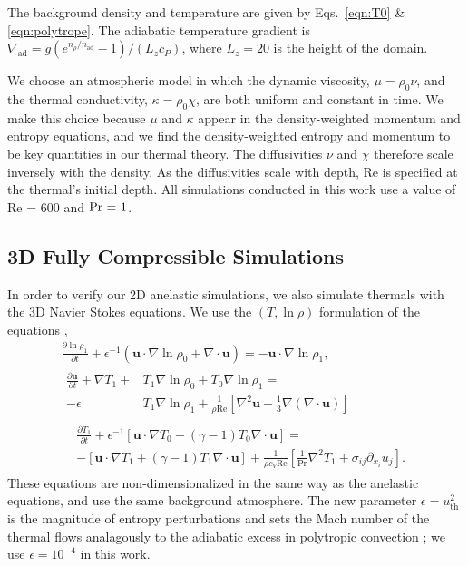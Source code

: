 \documentclass[twocolumn, amsmath, amsfonts, amssymb, trackchanges]{aastex62}
\newcommand{\DivU}{\ensuremath{\nabla\cdot\bm{u}}}
\newcommand{\grad}{\ensuremath{\nabla}}
\begin{document}
The background density and temperature are given by Eqs.~\ref{eqn:T0} \& \ref{eqn:polytrope}.
The adiabatic temperature gradient is $\nabla_{\text{ad}}=g(e^{n_\rho/n_{\text{ad}}}-1)/(L_z c_P)$, where $L_z=20$ is the height of the domain.

We choose an atmospheric model in which the dynamic viscosity, $\mu = \rho_0 \nu$, and the thermal conductivity, $\kappa = \rho_0 \chi$, are both uniform and constant in time.
We make this choice because $\mu$ and $\kappa$ appear in the density-weighted momentum and entropy equations, and we find the density-weighted entropy and momentum to be key quantities in our thermal theory.
The diffusivities $\nu$ and $\chi$ therefore scale inversely with the density.
As the diffusivities scale with depth, Re is specified at the thermal's initial depth.
All simulations conducted in this work use a value of Re = 600 and $\mbox{\text{Pr} = 1}$.

\subsection{3D Fully Compressible Simulations}
In order to verify our 2D anelastic simulations, we also simulate thermals with the 3D Navier Stokes equations. 
We use the $(T, \ln\rho)$ formulation of the equations \citep{lecoanet&all2014, anders&brown2017},
\begin{gather}
\frac{\partial \ln\rho_1}{\partial t} + \epsilon^{-1}\left(\bm{u}\cdot\grad\ln\rho_0 + \DivU\right) = -\bm{u}\cdot\grad\ln\rho_1, \\
\begin{split}
\frac{\partial \bm{u}}{\partial t}  +\grad T_1 + &T_1\grad\ln\rho_0 + T_0\grad\ln\rho_1  =\\
- \epsilon &T_1\grad\ln\rho_1 + \frac{1}{\rho\text{Re}}\left[\grad^2\bm{u} + \frac{1}{3}\grad(\DivU)\right]
\end{split} \\
\begin{split}
&\frac{\partial T_1}{\partial t} + \epsilon^{-1}\left[\bm{u}\cdot\grad T_0 + (\gamma-1)T_0\DivU\right] = \\
&-\left[\bm{u}\cdot\grad T_1 + (\gamma-1)T_1\DivU\right] + \frac{1}{\rho c_V\text{Re}}\left[\frac{1}{\text{Pr}}\grad^2 T_1 + \sigma_{ij}\partial_{x_i}u_j\right].
\end{split}
\end{gather}
These equations are non-dimensionalized in the same way as the anelastic equations, and use the same background atmosphere.
The new parameter $\epsilon = u_{\text{th}}^2$ is the magnitude of entropy perturbations and sets the Mach number of the thermal flows analagously to the adiabatic excess in polytropic convection \citep{anders&brown2017}; we use $\epsilon = 10^{-4}$ in this work. 
\end{document}
